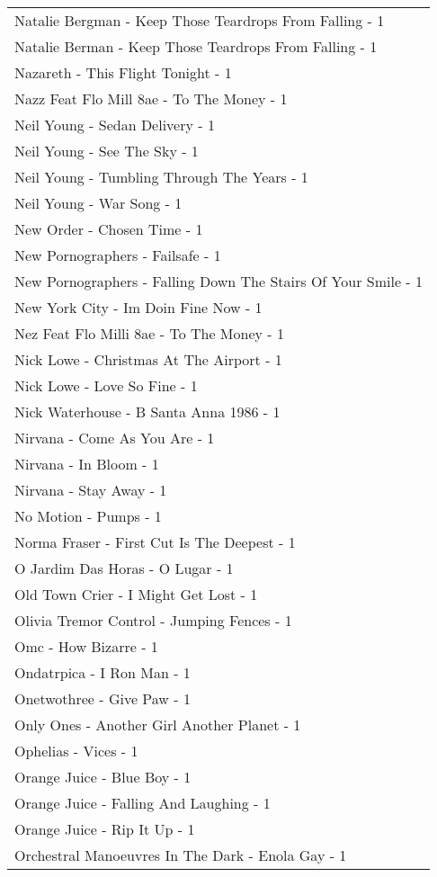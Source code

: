 \documentclass[
]{article}
\begin{document}
\begin{longtable}{l}
Natalie Bergman - Keep Those Teardrops From Falling - 1 \\ 
Natalie Berman - Keep Those Teardrops From Falling - 1 \\ 
Nazareth - This Flight Tonight - 1 \\ 
Nazz Feat Flo Mill 8ae - To The Money - 1 \\ 
Neil Young - Sedan Delivery - 1 \\ 
Neil Young - See The Sky - 1 \\ 
Neil Young - Tumbling Through The Years - 1 \\ 
Neil Young - War Song - 1 \\ 
New Order - Chosen Time - 1 \\ 
New Pornographers - Failsafe - 1 \\ 
New Pornographers - Falling Down The Stairs Of Your Smile - 1 \\ 
New York City - Im Doin Fine Now - 1 \\ 
Nez Feat Flo Milli 8ae - To The Money - 1 \\ 
Nick Lowe - Christmas At The Airport - 1 \\ 
Nick Lowe - Love So Fine - 1 \\ 
Nick Waterhouse - B Santa Anna 1986 - 1 \\ 
Nirvana - Come As You Are - 1 \\ 
Nirvana - In Bloom - 1 \\ 
Nirvana - Stay Away - 1 \\ 
No Motion - Pumps - 1 \\ 
Norma Fraser - First Cut Is The Deepest - 1 \\ 
O Jardim Das Horas - O Lugar - 1 \\ 
Old Town Crier - I Might Get Lost - 1 \\ 
Olivia Tremor Control - Jumping Fences - 1 \\ 
Omc - How Bizarre - 1 \\ 
Ondatrpica - I Ron Man - 1 \\ 
Onetwothree - Give Paw - 1 \\ 
Only Ones - Another Girl Another Planet - 1 \\ 
Ophelias - Vices - 1 \\ 
Orange Juice - Blue Boy - 1 \\ 
Orange Juice - Falling And Laughing - 1 \\ 
Orange Juice - Rip It Up - 1 \\ 
Orchestral Manoeuvres In The Dark - Enola Gay - 1 \\ 

\end{longtable}
\end{document}
